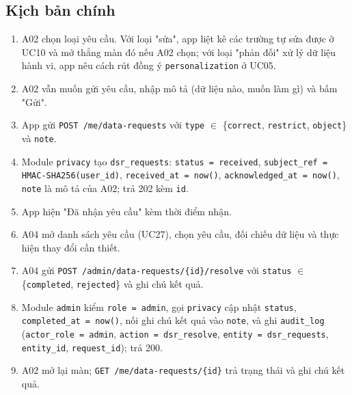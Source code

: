 \subsection{Kịch bản chính}
\begin{enumerate}
\item A02 chọn loại yêu cầu. Với loại "sửa", app liệt kê các trường tự sửa được ở UC10 và mở thẳng màn đó nếu A02 chọn; với loại "phản đối" xử lý dữ liệu hành vi, app nêu cách rút đồng ý {\small\texttt{personalization}} ở UC05.
\item A02 vẫn muốn gửi yêu cầu, nhập mô tả (dữ liệu nào, muốn làm gì) và bấm "Gửi".
\item App gửi {\small\texttt{POST /\allowbreak{}\allowbreak{}me/\allowbreak{}\allowbreak{}data-\allowbreak{}requests}} với {\small\texttt{type}} \ensuremath{\in} \{{\small\texttt{correct}}, {\small\texttt{restrict}}, {\small\texttt{object}}\} và {\small\texttt{note}}.
\item Module {\small\texttt{privacy}} tạo {\small\texttt{dsr\_\allowbreak{}\allowbreak{}requests}}: {\small\texttt{status = received}}, {\small\texttt{subject\_\allowbreak{}\allowbreak{}ref = HMAC-\allowbreak{}SHA256(user\_\allowbreak{}\allowbreak{}id)}}, {\small\texttt{received\_\allowbreak{}\allowbreak{}at = now()}}, {\small\texttt{acknowledged\_\allowbreak{}\allowbreak{}at = now()}}, {\small\texttt{note}} là mô tả của A02; trả 202 kèm {\small\texttt{id}}.
\item App hiện "Đã nhận yêu cầu" kèm thời điểm nhận.
\item A04 mở danh sách yêu cầu (UC27), chọn yêu cầu, đối chiếu dữ liệu và thực hiện thay đổi cần thiết.
\item A04 gửi {\small\texttt{POST /\allowbreak{}\allowbreak{}admin/\allowbreak{}\allowbreak{}data-\allowbreak{}requests/\allowbreak{}\allowbreak{}\{id\}/\allowbreak{}\allowbreak{}resolve}} với {\small\texttt{status}} \ensuremath{\in} \{{\small\texttt{completed}}, {\small\texttt{rejected}}\} và ghi chú kết quả.
\item Module {\small\texttt{admin}} kiểm {\small\texttt{role = admin}}, gọi {\small\texttt{privacy}} cập nhật {\small\texttt{status}}, {\small\texttt{completed\_\allowbreak{}\allowbreak{}at = now()}}, nối ghi chú kết quả vào {\small\texttt{note}}, và ghi {\small\texttt{audit\_\allowbreak{}\allowbreak{}log}} ({\small\texttt{actor\_\allowbreak{}\allowbreak{}role = admin}}, {\small\texttt{action = dsr\_\allowbreak{}\allowbreak{}resolve}}, {\small\texttt{entity = dsr\_\allowbreak{}\allowbreak{}requests}}, {\small\texttt{entity\_\allowbreak{}\allowbreak{}id}}, {\small\texttt{request\_\allowbreak{}\allowbreak{}id}}); trả 200.
\item A02 mở lại màn; {\small\texttt{GET /\allowbreak{}\allowbreak{}me/\allowbreak{}\allowbreak{}data-\allowbreak{}requests/\allowbreak{}\allowbreak{}\{id\}}} trả trạng thái và ghi chú kết quả.
\end{enumerate}
